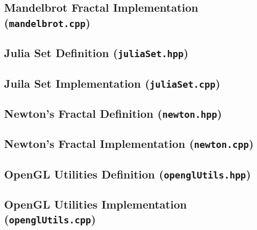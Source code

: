 \pagebreak

\subsection{Mandelbrot Fractal Implementation (\texttt{mandelbrot.cpp})}


\pagebreak

\subsection{Julia Set Definition (\texttt{juliaSet.hpp})}


\pagebreak

\subsection{Juila Set Implementation (\texttt{juliaSet.cpp})}


\pagebreak

\subsection{Newton's Fractal Definition (\texttt{newton.hpp})}


\pagebreak

\subsection{Newton's Fractal Implementation (\texttt{newton.cpp})}


\pagebreak

\subsection{OpenGL Utilities Definition (\texttt{openglUtils.hpp})}


\pagebreak

\subsection{OpenGL Utilities Implementation (\texttt{openglUtils.cpp})}


